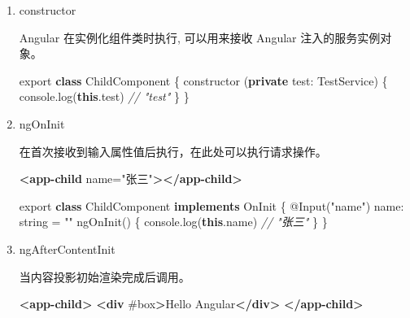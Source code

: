 \documentclass[
]{article}
\newenvironment{Shaded}{}{}
\newcommand{\AttributeTok}[1]{\textcolor[rgb]{0.49,0.56,0.16}{#1}}
\newcommand{\BuiltInTok}[1]{#1}
\newcommand{\CommentTok}[1]{\textcolor[rgb]{0.38,0.63,0.69}{\textit{#1}}}
\newcommand{\DataTypeTok}[1]{\textcolor[rgb]{0.56,0.13,0.00}{#1}}
\newcommand{\FunctionTok}[1]{\textcolor[rgb]{0.02,0.16,0.49}{#1}}
\newcommand{\ImportTok}[1]{#1}
\newcommand{\KeywordTok}[1]{\textcolor[rgb]{0.00,0.44,0.13}{\textbf{#1}}}
\newcommand{\NormalTok}[1]{#1}
\newcommand{\OperatorTok}[1]{\textcolor[rgb]{0.40,0.40,0.40}{#1}}
\newcommand{\OtherTok}[1]{\textcolor[rgb]{0.00,0.44,0.13}{#1}}
\newcommand{\StringTok}[1]{\textcolor[rgb]{0.25,0.44,0.63}{#1}}
\begin{document}
\begin{enumerate}
\def\labelenumi{\arabic{enumi}.}
\item
  constructor

  Angular 在实例化组件类时执行, 可以用来接收 Angular
  注入的服务实例对象。

\begin{Shaded}
\begin{Highlighting}[]
\ImportTok{export} \KeywordTok{class}\NormalTok{ ChildComponent \{}
  \FunctionTok{constructor}\NormalTok{ (}\KeywordTok{private} \DataTypeTok{test}\OperatorTok{:}\NormalTok{ TestService) \{}
    \BuiltInTok{console}\OperatorTok{.}\FunctionTok{log}\NormalTok{(}\KeywordTok{this}\OperatorTok{.}\AttributeTok{test}\NormalTok{) }\CommentTok{// "test"}
\NormalTok{  \}}
\NormalTok{\}}
\end{Highlighting}
\end{Shaded}
\item
  ngOnInit

  在首次接收到输入属性值后执行，在此处可以执行请求操作。

\begin{Shaded}
\begin{Highlighting}[]
\KeywordTok{\textless{}app{-}child}\OtherTok{ name=}\StringTok{"张三"}\KeywordTok{\textgreater{}\textless{}/app{-}child\textgreater{}}
\end{Highlighting}
\end{Shaded}

\begin{Shaded}
\begin{Highlighting}[]
\ImportTok{export} \KeywordTok{class}\NormalTok{ ChildComponent }\KeywordTok{implements}\NormalTok{ OnInit \{}
\NormalTok{  @}\FunctionTok{Input}\NormalTok{(}\StringTok{"name"}\NormalTok{) }\DataTypeTok{name}\OperatorTok{:}\NormalTok{ string }\OperatorTok{=} \StringTok{""}
  \FunctionTok{ngOnInit}\NormalTok{() \{}
    \BuiltInTok{console}\OperatorTok{.}\FunctionTok{log}\NormalTok{(}\KeywordTok{this}\OperatorTok{.}\AttributeTok{name}\NormalTok{) }\CommentTok{// "张三"}
\NormalTok{  \}}
\NormalTok{\}}
\end{Highlighting}
\end{Shaded}
\item
  ngAfterContentInit

  当内容投影初始渲染完成后调用。

\begin{Shaded}
\begin{Highlighting}[]
\KeywordTok{\textless{}app{-}child\textgreater{}}
	\KeywordTok{\textless{}div}\OtherTok{ \#box}\KeywordTok{\textgreater{}}\NormalTok{Hello Angular}\KeywordTok{\textless{}/div\textgreater{}}
\KeywordTok{\textless{}/app{-}child\textgreater{}}
\end{Highlighting}
\end{Shaded}


\end{enumerate}
\end{document}
